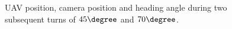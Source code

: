 \begin{figure}
	\caption{UAV position, camera position and heading angle during two subsequent turns of $45\degree$ and $70\degree$.}
	\label{fig:paths_cur_150m}
\end{figure}